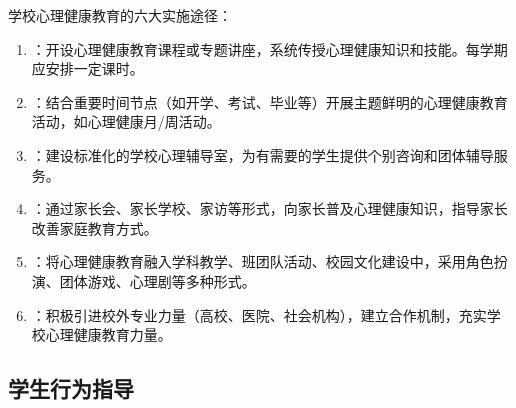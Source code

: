 \begin{keybox}
学校心理健康教育的六大实施途径：

\begin{enumerate}[leftmargin=*]
    \item {}：开设心理健康教育课程或专题讲座，系统传授心理健康知识和技能。每学期应安排一定课时。
    \item {}：结合重要时间节点（如开学、考试、毕业等）开展主题鲜明的心理健康教育活动，如心理健康月/周活动。
    \item {}：建设标准化的学校心理辅导室，为有需要的学生提供个别咨询和团体辅导服务。
    \item {}：通过家长会、家长学校、家访等形式，向家长普及心理健康知识，指导家长改善家庭教育方式。
    \item {}：将心理健康教育融入学科教学、班团队活动、校园文化建设中，采用角色扮演、团体游戏、心理剧等多种形式。
    \item {}：积极引进校外专业力量（高校、医院、社会机构），建立合作机制，充实学校心理健康教育力量。
\end{enumerate}
\end{keybox}

\subsection{学生行为指导}

